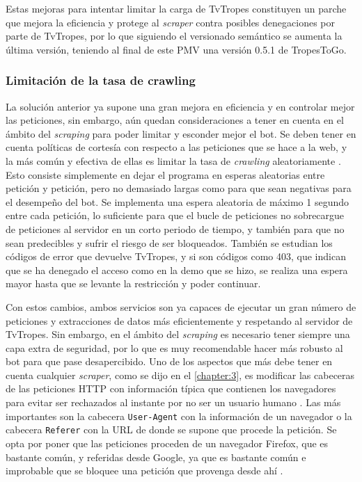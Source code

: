 Estas mejoras para intentar limitar la carga de TvTropes constituyen un parche
que mejora la eficiencia y protege al \textit{scraper} contra posibles
denegaciones por parte de TvTropes, por lo que siguiendo el versionado semántico
se aumenta la última versión, teniendo al final de este PMV una versión 0.5.1 de
TropesToGo.

\subsubsection{Limitación de la tasa de crawling}
La solución anterior ya supone una gran mejora en eficiencia y en controlar
mejor las peticiones, sin embargo, aún quedan consideraciones a tener en cuenta
en el ámbito del \textit{scraping} para poder limitar y esconder mejor el bot.
Se deben tener en cuenta políticas de cortesía con respecto a las peticiones que
se hace a la web, y la más común y efectiva de ellas es limitar la tasa de
\textit{crawling} aleatoriamente \cite{apress2018scraping}. Esto consiste
simplemente en dejar el programa en esperas aleatorias entre petición y
petición, pero no demasiado largas como para que sean negativas para el
desempeño del bot. Se implementa una espera aleatoria de máximo 1 segundo entre
cada petición, lo suficiente para que el bucle de peticiones no sobrecargue de
peticiones al servidor en un corto periodo de tiempo, y también para que no sean
predecibles y sufrir el riesgo de ser bloqueados. También se estudian
los códigos de error que devuelve TvTropes, y si son códigos como 403, que
indican que se ha denegado el acceso como en la demo que se hizo, se realiza una
espera mayor hasta que se levante la restricción y poder continuar.

Con estos cambios, ambos servicios son ya capaces de ejecutar un gran número de
peticiones y extracciones de datos más eficientemente y respetando al
servidor de TvTropes. Sin embargo, en el ámbito del \textit{scraping} es
necesario tener siempre una capa extra de seguridad, por lo que es muy
recomendable hacer más robusto al bot para que pase desapercibido. Uno de
los aspectos que más debe tener en cuenta cualquier \textit{scraper}, como se
dijo en el \autoref{chapter:3}, es modificar las cabeceras de las peticiones
HTTP con información típica que contienen los navegadores para evitar ser
rechazados al instante por no ser un usuario humano \cite{apress2018scraping}.
Las más importantes son la cabecera \texttt{User-Agent} con la información de un
navegador o la cabecera \texttt{Referer} con la URL de donde se supone que
procede la petición. Se opta por poner que las peticiones proceden de un
navegador Firefox, que es bastante común, y referidas desde Google, ya que es
bastante común e improbable que se bloquee una petición que provenga desde ahí
\cite{bettenbuk_10_2019}.

